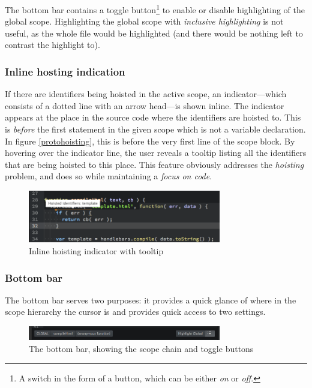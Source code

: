 The bottom bar contains a toggle
button\footnote{A switch in the form of a button, which can be either \emph{on} or \emph{off}.}
to enable or disable highlighting of the global scope. Highlighting the
global scope with \emph{inclusive highlighting} is not useful, as the
whole file would be highlighted (and there would be nothing left to
contrast the highlight to).

\subsubsection{Inline hosting
indication}\label{inline-hosting-indication}

If there are identifiers being hoisted in the active scope, an
indicator—which consists of a dotted line with an arrow head—is shown
inline. The indicator appears at the place in the source code where the
identifiers are hoisted to. This is \emph{before} the first statement in
the given scope which is not a variable declaration. In figure
\ref{protohoisting}, this is before the very first line of the scope
block. By hovering over the indicator line, the user reveals a tooltip
listing all the identifiers that are being hoisted to this place. This
feature obviously addresses the \emph{hoisting} problem, and does so
while maintaining a \emph{focus on code}.

\begin{figure}[htbp]
\centering
\includegraphics[keepaspectratio,width=0.75\textwidth]{img/hoisting.png}
\caption{Inline hoisting indicator with tooltip}
\label{fig:protohoisting}
\end{figure}

\subsubsection{Bottom bar}\label{bottom-bar}

The bottom bar serves two purposes: it provides a quick glance of where
in the scope hierarchy the cursor is and provides quick access to two
settings.

\begin{figure}[htbp]
\centering
\includegraphics[keepaspectratio,width=0.75\textwidth]{img/bottombar.png}
\caption{The bottom bar, showing the scope chain and toggle buttons}
\label{fig:bottombar}
\end{figure}

